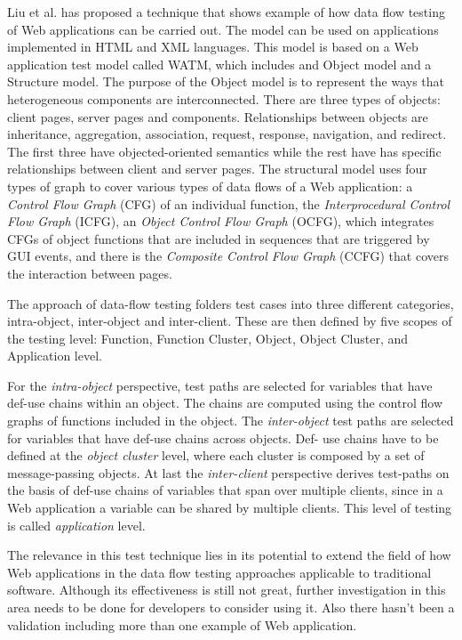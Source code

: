 \documentclass[a4paper, twocolumn]{ieee}
\begin{document}
Liu et al.\cite{lkhh01} has proposed a technique that shows example of how data flow testing of Web
applications can be carried out. The model can be used on applications implemented in HTML and
XML languages. This model is based on a Web application test model called WATM, which includes
and Object model and a Structure model. The purpose of the Object model is to represent the
ways that heterogeneous components are interconnected. There are three types of objects: client
pages, server pages and components. Relationships between objects are inheritance, aggregation,
association, request, response, navigation, and redirect. The first three have objected-oriented
semantics while the rest have has specific relationships between client and server pages. The
structural model uses four types of graph to cover various types of data flows of a Web application:
a \emph{Control Flow Graph} (CFG) of an individual function, the \emph{Interprocedural Control Flow Graph} (ICFG),
an \emph{Object Control Flow Graph} (OCFG), which integrates CFGs of object functions that are included in
sequences that are triggered by GUI events, and there is the \emph{Composite Control Flow Graph} (CCFG)
that covers the interaction between pages.

The approach of data-flow testing folders test cases into three different categories, intra-object,
inter-object and inter-client. These are then defined by five scopes of the testing level: Function,
Function Cluster, Object, Object Cluster, and Application level.

For the \emph{intra-object} perspective, test paths are selected for variables that have def-use chains within
an object. The chains are computed using the control flow graphs of functions included in the object.
The \emph{inter-object} test paths are selected for variables that have def-use chains across objects. Def-
use chains have to be defined at the \emph{object cluster} level, where each cluster is composed by a set of
message-passing objects. At last the \emph{inter-client} perspective derives test-paths on the basis of def-use
chains of variables that span over multiple clients, since in a Web application a variable can be shared
by multiple clients. This level of testing is called \emph{application} level.

The relevance in this test technique lies in its potential to extend the field of how Web applications in
the data flow testing approaches applicable to traditional software. Although its effectiveness is still
not great, further investigation in this area needs to be done for developers to consider using it. Also
there hasn’t been a validation including more than one example of Web application.
\end{document}
